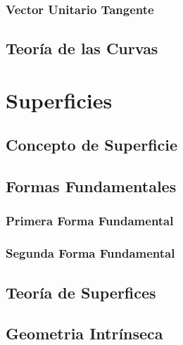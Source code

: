 \documentclass[letterpaper,11pt,twoside]{report}
\begin{document}
\subsection{Vector Unitario Tangente}

\section{Teor\'ia de las Curvas}

\chapter{Superficies}

\section{Concepto de Superficie}

\section{Formas Fundamentales}

\subsection{Primera Forma Fundamental}

\subsection{Segunda Forma Fundamental}

\section{Teor\'ia de Superfices}

\section{Geometria Intr\'inseca}
\end{document}
